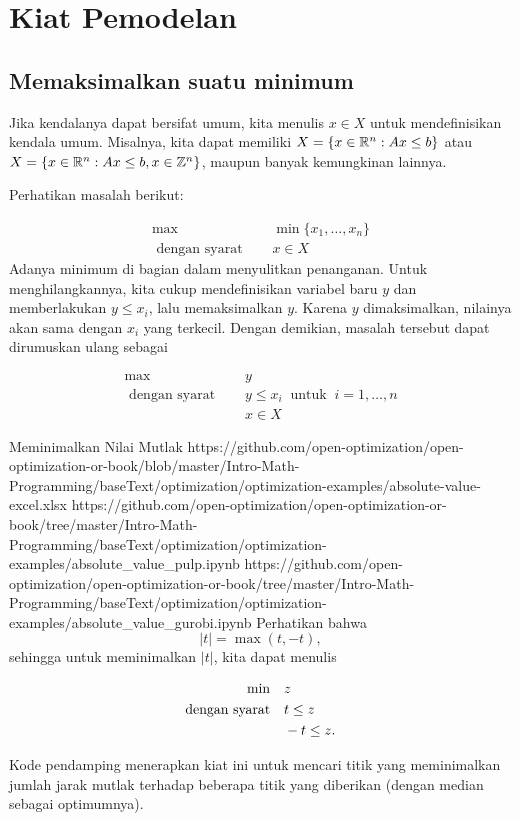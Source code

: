 \section{Kiat Pemodelan}

\subsection{Memaksimalkan suatu minimum}
Jika kendalanya dapat bersifat umum, kita menulis $x \in X$ untuk mendefinisikan kendala umum. Misalnya, kita dapat memiliki $X = \{ x \in {\mathbb{R}}^n : Ax \leq b\}$ atau $X  = \{ x \in {\mathbb{R}}^n : Ax \leq b, x \in {\mathbb{Z}}^n\}$, maupun banyak kemungkinan lainnya.  

Perhatikan masalah berikut:

\begin{align*}
\max   \quad & \min \{x_1, \dots, x_n\}\\
\text{ dengan syarat } \quad &  x \in X
\end{align*}
Adanya minimum di bagian dalam menyulitkan penanganan. Untuk menghilangkannya, kita cukup mendefinisikan variabel baru $y$ dan memberlakukan $y \leq x_i$, lalu memaksimalkan $y$. Karena $y$ dimaksimalkan, nilainya akan sama dengan $x_i$ yang terkecil. Dengan demikian, masalah tersebut dapat dirumuskan ulang sebagai

\begin{align*}
\max\quad    & y\\
\text{ dengan syarat } \quad  & y \leq x_i \ \text{ untuk }\  i=1, \dots, n \\
&  x \in X
\end{align*}

\begin{examplewithallcode}{Meminimalkan Nilai Mutlak}
{https://github.com/open-optimization/open-optimization-or-book/blob/master/Intro-Math-Programming/baseText/optimization/optimization-examples/absolute-value-excel.xlsx}
{https://github.com/open-optimization/open-optimization-or-book/tree/master/Intro-Math-Programming/baseText/optimization/optimization-examples/absolute_value_pulp.ipynb}
{https://github.com/open-optimization/open-optimization-or-book/tree/master/Intro-Math-Programming/baseText/optimization/optimization-examples/absolute_value_gurobi.ipynb}
Perhatikan bahwa
$$
|t| = \max(t, -t),
$$
sehingga untuk meminimalkan $|t|$, kita dapat menulis

\begin{align*}
\min \quad & z\\
\mbox{dengan syarat}\quad        & t \leq z\\
           & -t \leq z.
\end{align*}

Kode pendamping menerapkan kiat ini untuk mencari titik yang meminimalkan jumlah
jarak mutlak terhadap beberapa titik yang diberikan (dengan median sebagai optimumnya).
\end{examplewithallcode}
